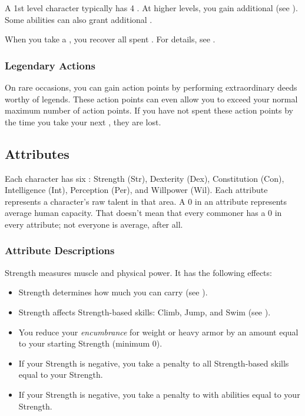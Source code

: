         A 1st level character typically has 4 .
        At higher levels, you gain additional  (see ).
        Some abilities can also grant additional .

        When you take a , you recover all spent .
        For details, see .

        \subsubsection{Legendary Actions}
            On rare occasions, you can gain action points by performing extraordinary deeds worthy of legends.
            These action points can even allow you to exceed your normal maximum number of action points.
            If you have not spent these action points by the time you take your next , they are lost.

    \subsection{Attributes}\label{Attributes}

        Each character has six : Strength (Str), Dexterity (Dex), Constitution (Con), Intelligence (Int), Perception (Per), and Willpower (Wil).
        Each attribute represents a character's raw talent in that area.
        A 0 in an attribute represents average human capacity.
        That doesn't mean that every commoner has a 0 in every attribute; not everyone is average, after all.

        \subsubsection{Attribute Descriptions}

            \label{Strength}
                Strength measures muscle and physical power.
                It has the following effects:
                \begin{itemize}
                    \item Strength determines how much you can carry (see ).
                    \item Strength affects Strength-based skills: Climb, Jump, and Swim (see ).
                    \item You reduce your \textit{encumbrance} for weight or heavy armor by an amount equal to your starting Strength (minimum 0).
                    \item If your Strength is negative, you take a penalty to all Strength-based skills equal to your Strength.
                    \item If your Strength is negative, you take a penalty to  with  abilities equal to your Strength.
                \end{itemize}

